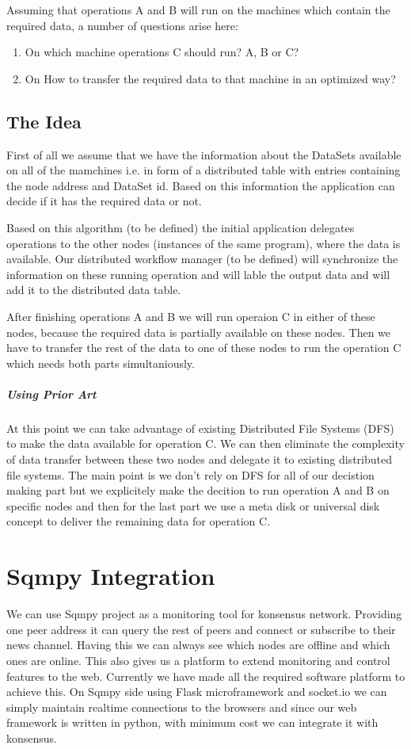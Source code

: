 Assuming that operations A and B will run on the machines which
contain the required data, a number of questions arise here:
\begin{enumerate}
\item On which machine operations C should run? A, B or C?
\item On How to transfer the required data to that machine in an 
optimized way?
\end{enumerate}

\subsection{The Idea}
First of all we assume that we have the information about the DataSets
available on all of the mamchines i.e. in form of a distributed table
with entries containing the node address and DataSet id. Based on this
information the application can decide if it has the required data or
not. 

Based on this algorithm (to be defined) the initial application
delegates operations to the other nodes (instances of the same program),
where the data is available. Our distributed workflow manager (to be 
defined) will synchronize the information on these running operation and
will lable the output data and will add it to the distributed data table.

After finishing operations A and B we will run operaion C in either
of these nodes, because the required data is partially available on these
nodes. Then we have to transfer the rest of the data to one of these
nodes to run the operation C which needs both parts simultaniously.

\subparagraph{Using Prior Art}
At this point we can take advantage of existing Distributed File Systems
(DFS) to make the data available for operation C. We can then eliminate
the complexity of data transfer between these two nodes and delegate it
to existing distributed file systems. The main point is we don't rely on
DFS for all of our decistion making part but we explicitely make the 
decition to run operation A and B on specific nodes and then for the 
last part we use a meta disk or universal disk concept to deliver the
remaining data for operation C.

\section{Sqmpy Integration}
We can use Sqmpy project as a monitoring tool for konsensus network.
 Providing one peer address it can query the rest of peers and connect or 
subscribe to their news channel. Having this we can always see which nodes are
offline and which ones are online. This also gives us a platform to extend
monitoring and control features to the web. Currently we have made all the 
required software platform to achieve this. On Sqmpy side using Flask microframework
and socket.io we can simply maintain realtime connections to the browsers and since
our web framework is written in python, with minimum cost we can integrate it
with konsensus.
